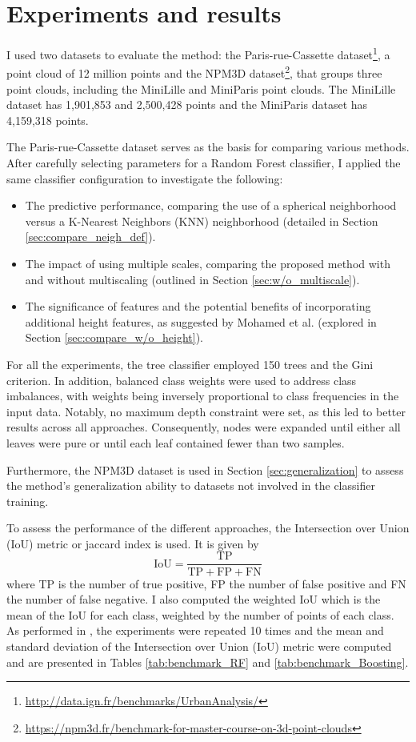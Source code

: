 \documentclass{article}
\begin{document}
\section{Experiments and results}\label{sec:experiments}
I used two datasets to evaluate the method: the Paris-rue-Cassette dataset\footnote{\url{http://data.ign.fr/benchmarks/UrbanAnalysis/}}, a point cloud of 12 million points and the NPM3D dataset\footnote{\url{https://npm3d.fr/benchmark-for-master-course-on-3d-point-clouds}}, that groups three point clouds, including the MiniLille and MiniParis point clouds. The MiniLille dataset has 1,901,853 and 2,500,428 points and the MiniParis dataset has 4,159,318 points. 

The Paris-rue-Cassette dataset serves as the basis for comparing various methods. After carefully selecting parameters for a Random Forest classifier, I applied the same classifier configuration to investigate the following:
\begin{itemize}
    \item The predictive performance, comparing the use of a spherical neighborhood versus a K-Nearest Neighbors (KNN) neighborhood (detailed in Section \ref{sec:compare_neigh_def}).
    \item The impact of using multiple scales, comparing the proposed method with and without multiscaling (outlined in Section \ref{sec:w/o_multiscale}).
    \item The significance of features and the potential benefits of incorporating additional height features, as suggested by Mohamed et al. \cite{mohamed_improvement_2022} (explored in Section \ref{sec:compare_w/o_height}).
\end{itemize}
For all the experiments, the tree classifier employed 150 trees and the Gini criterion. In addition, balanced class weights were used to address class imbalances, with weights being inversely proportional to class frequencies in the input data. Notably, no maximum depth constraint were set, as this led to better results across all approaches. Consequently, nodes were expanded until either all leaves were pure or until each leaf contained fewer than two samples.
    
Furthermore, the NPM3D dataset is used in Section \ref{sec:generalization} to assess the method's generalization ability to datasets not involved in the classifier training.

To assess the performance of the different approaches, the Intersection over Union (IoU) metric or jaccard index is used. It is given by 
$$
\textrm{IoU} = \frac{\textrm{TP}}{\textrm{TP} + \textrm{FP} + \textrm{FN}}
$$
where TP is the number of true positive, FP the number of false positive and FN the number of false negative. I also computed the weighted IoU which is the mean of the IoU for each class, weighted by the number of points of each class. As performed in \cite{thomas_semantic_2018}, the experiments were repeated 10 times and the mean and standard deviation of the Intersection over Union (IoU) metric were computed and are presented in Tables \ref{tab:benchmark_RF} and \ref{tab:benchmark_Boosting}.
\end{document}
